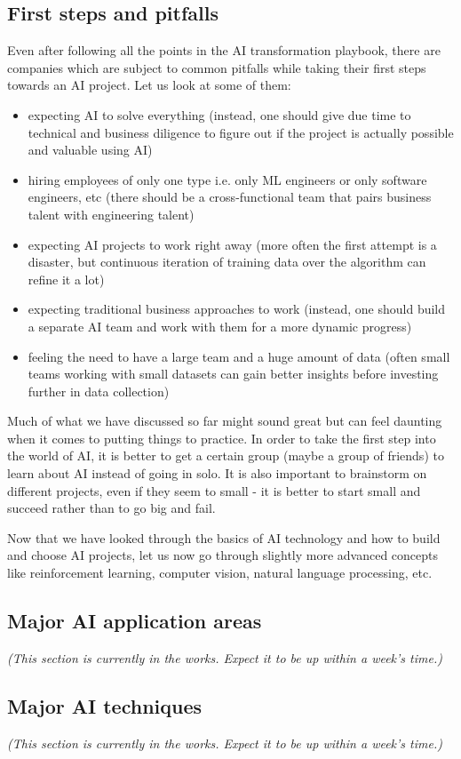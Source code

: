 \documentclass{article}[a4paper,12pt]
\theoremstyle{definition}
\begin{document}
\subsection{First steps and pitfalls}
Even after following all the points in the AI transformation playbook, there are companies which are subject to common pitfalls while taking their first steps towards an AI project.  Let us look at some of them:
\begin{itemize}
	\item expecting AI to solve everything (instead, one should give due time to technical and business diligence to figure out if the project is actually possible and valuable using AI)
	\item hiring employees of only one type i.e. only ML engineers or only software engineers, etc (there should be a cross-functional team that pairs business talent with engineering talent)
	\item expecting AI projects to work right away (more often the first attempt is a disaster, but continuous iteration of training data over the algorithm can refine it a lot)
	\item expecting traditional business approaches to work (instead, one should build a separate AI team and work with them for a more dynamic progress)
	\item feeling the need to have a large team and a huge amount of data (often small teams working with small datasets can gain better insights before investing further in data collection)
\end{itemize}
Much of what we have discussed so far might sound great but can feel daunting when it comes to putting things to practice. In order to take the first step into the world of AI, it is better to get a certain group (maybe a group of friends) to learn about AI instead of going in solo. It is also important to brainstorm on different projects, even if they seem to small - it is better to start small and succeed rather than to go big and fail.
\vspace{6pt}

Now that we have looked through the basics of AI technology and how to build and choose AI projects, let us now go through slightly more advanced concepts like reinforcement learning, computer vision, natural language processing, etc.
\subsection{Major AI application areas}
\textit{(This section is currently in the works. Expect it to be up within a week's time.)}
\subsection{Major AI techniques}
\textit{(This section is currently in the works. Expect it to be up within a week's time.)}

\hrulefill
\end{document}
